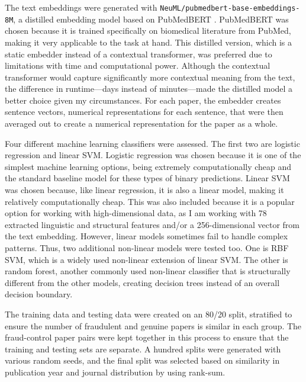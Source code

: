 \documentclass[11pt,letterpaper]{article}
\begin{document}
The text embeddings were generated with \texttt{NeuML/pubmedbert-base-embeddings-8M}, a distilled embedding model based on PubMedBERT \cite{gu2022pubmedbert,neuml_pubmedbert8m}. PubMedBERT was chosen because it is trained specifically on biomedical literature from PubMed, making it very applicable to the task at hand. This distilled version, which is a static embedder instead of a contextual transformer, was preferred due to limitations with time and computational power. Although the contextual transformer would capture significantly more contextual meaning from the text, the difference in runtime---days instead of minutes---made the distilled model a better choice given my circumstances. For each paper, the embedder creates sentence vectors, numerical representations for each sentence, that were then averaged out to create a numerical representation for the paper as a whole.

Four different machine learning classifiers were assessed. The first two are logistic regression and linear SVM. Logistic regression was chosen because it is one of the simplest machine learning options, being extremely computationally cheap and the standard baseline model for these types of binary predictions. Linear SVM was chosen because, like linear regression, it is also a linear model, making it relatively computationally cheap. This was also included because it is a popular option for working with high-dimensional data, as I am working with 78 extracted linguistic and structural features and/or a 256-dimensional vector from the text embedding. However, linear models sometimes fail to handle complex patterns. Thus, two additional non-linear models were tested too. One is RBF SVM, which is a widely used non-linear extension of linear SVM. The other is random forest, another commonly used non-linear classifier that is structurally different from the other models, creating decision trees instead of an overall decision boundary.

The training data and testing data were created on an 80/20 split, stratified to ensure the number of fraudulent and genuine papers is similar in each group. The fraud-control paper pairs were kept together in this process to ensure that the training and testing sets are separate. A hundred splits were generated with various random seeds, and the final split was selected based on similarity in publication year and journal distribution by using rank-sum. 
\end{document}
